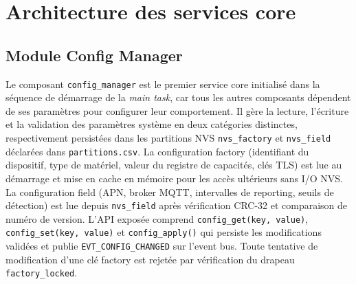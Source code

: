 \section{Architecture des services core}
\label{sec:services_core}

\subsection{Module Config Manager}
\label{subsec:mod_config}

Le composant \texttt{config\_manager} est le premier service core
initialisé dans la séquence de démarrage de la \textit{main task},
car tous les autres composants dépendent de ses paramètres pour
configurer leur comportement. Il gère la lecture, l'écriture et la
validation des paramètres système en deux catégories distinctes,
respectivement persistées dans les partitions NVS \texttt{nvs\_factory}
et \texttt{nvs\_field} déclarées dans \texttt{partitions.csv}. La
configuration factory (identifiant du dispositif, type de matériel,
valeur du registre de capacités, clés TLS) est lue au démarrage et
mise en cache en mémoire pour les accès ultérieurs sans I/O NVS.
La configuration field (APN, broker MQTT, intervalles de reporting,
seuils de détection) est lue depuis \texttt{nvs\_field} après
vérification CRC-32 et comparaison de numéro de version. L'API
exposée comprend \texttt{config\_get(key, value)},
\texttt{config\_set(key, value)} et \texttt{config\_apply()} qui
persiste les modifications validées et publie \texttt{EVT\_CONFIG\_CHANGED}
sur l'event bus. 
\newpage 
Toute tentative de modification d'une clé factory
est rejetée par vérification du drapeau \texttt{factory\_locked}.

